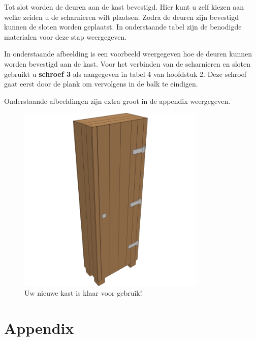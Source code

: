 \documentclass{article}
\begin{document}
Tot slot worden de deuren aan de kast bevestigd. Hier kunt u zelf kiezen aan welke zeiden u de scharnieren wilt plaatsen. Zodra de deuren zijn bevestigd kunnen de sloten worden geplaatst. In onderstaande tabel zijn de benodigde materialen voor deze stap weergegeven.



In onderstaande afbeelding is een voorbeeld weergegeven hoe de deuren kunnen worden bevestigd aan de kast. Voor het verbinden van de scharnieren en sloten gebruikt u \textbf{schroef 3} als aangegeven in tabel 4 van hoofdstuk 2. Deze schroef gaat eerst door de plank om vervolgens in de balk te eindigen.

Onderstaande afbeeldingen zijn extra groot in de appendix weergegeven.

\begin{figure}[h!]
    \centering
    \includegraphics[width=0.8\textwidth]{scene 12 - compleet.png}
    \caption{Uw nieuwe kast is klaar voor gebruik!}
    \label{fig:stap 12}
\end{figure}

\clearpage
\newpage

\section{Appendix}
\end{document}
